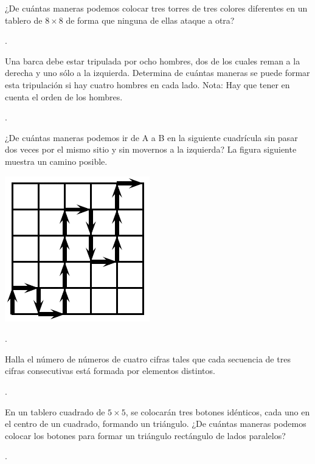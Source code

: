 \documentclass[11pt]{scrartcl}
\begin{document}
\begin{problem}
¿De cuántas maneras podemos colocar tres torres de tres colores diferentes en un tablero de $8 \times 8$ de forma que ninguna de ellas ataque a otra?
    \begin{hint}
    .
    \end{hint}
\end{problem}

\begin{problem}
Una barca debe estar tripulada por ocho hombres, dos de los cuales reman a la derecha y uno sólo a la izquierda. Determina de cuántas maneras se puede formar esta tripulación si hay cuatro hombres en cada lado. Nota: Hay que tener en cuenta el orden de los hombres.
    \begin{hint}
    .
    \end{hint}
\end{problem}

\begin{problem}
¿De cuántas maneras podemos ir de A a B en la siguiente cuadrícula sin pasar dos veces por el mismo sitio y sin movernos a la izquierda? La figura siguiente muestra un camino posible.
\begin{center}
    \includegraphics[scale=0.4]{clase_04_camino.png}
\end{center}
    \begin{hint}
    .
    \end{hint}
\end{problem}

\begin{problem}
Halla el número de números de cuatro cifras tales que cada secuencia de tres cifras consecutivas está formada por elementos distintos.
\begin{hint}
    .
\end{hint}
\end{problem}

\begin{problem}[OBM 2005]
En un tablero cuadrado de $5 \times 5$, se colocarán tres botones idénticos, cada uno en el centro de un cuadrado, formando un triángulo. ¿De cuántas maneras podemos colocar los botones para formar un triángulo rectángulo de lados paralelos?
\begin{hint}
    .
\end{hint}
\end{problem}
\end{document}

